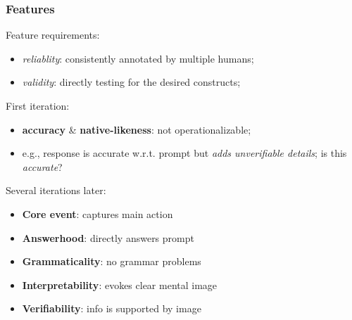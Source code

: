 \documentclass[xcolor={dvipsnames}]{beamer}
\begin{document}
\begin{frame}
\frametitle{Features}
\pause
Feature requirements:
\begin{itemize}
\pause
\item \textit{reliablity}: consistently annotated by multiple humans;
\pause
\item \textit{validity}: directly testing for the desired constructs;
\end{itemize}
\pause
First iteration:
\begin{itemize}
\pause
\item \textbf{accuracy} \& \textbf{native-likeness}: \pause not operationalizable;
\pause
\item e.g., response is accurate w.r.t. prompt but \textit{adds unverifiable details}; is this \textit{accurate}?
\end{itemize}
\pause
Several iterations later:
\begin{itemize}
\pause
\item \textbf{Core event}: \pause captures main action
\pause
\item \textbf{Answerhood}: \pause directly answers prompt
\pause
\item \textbf{Grammaticality}: \pause no grammar problems
\pause
\item \textbf{Interpretability}: \pause evokes clear mental image
\pause
\item \textbf{Verifiability}: \pause info is supported by image
\end{itemize}


\end{frame}
\end{document}

